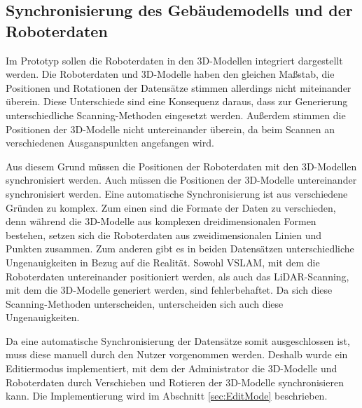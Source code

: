 \subsection{Synchronisierung des Gebäudemodells und der Roboterdaten}
Im Prototyp sollen die Roboterdaten in den 3D-Modellen integriert dargestellt werden. Die Roboterdaten und 3D-Modelle haben den gleichen Maßstab, die Positionen und Rotationen der Datensätze stimmen allerdings nicht miteinander überein. Diese Unterschiede sind eine Konsequenz daraus, dass zur Generierung unterschiedliche Scanning-Methoden eingesetzt werden. Außerdem stimmen die Positionen der 3D-Modelle nicht untereinander überein, da beim Scannen an verschiedenen Ausganspunkten angefangen wird.

Aus diesem Grund müssen die Positionen der Roboterdaten mit den 3D-Modellen synchronisiert werden. Auch müssen die Positionen der 3D-Modelle untereinander synchronisiert werden. Eine automatische Synchronisierung ist aus verschiedene Gründen zu komplex. Zum einen sind die Formate der Daten zu verschieden, denn während die 3D-Modelle aus komplexen dreidimensionalen Formen bestehen, setzen sich die Roboterdaten aus zweidimensionalen Linien und Punkten zusammen. Zum anderen gibt es in beiden Datensätzen unterschiedliche Ungenauigkeiten in Bezug auf die Realität. Sowohl \ac{VSLAM}, mit dem die Roboterdaten untereinander positioniert werden, als auch das \ac{LiDAR}-Scanning, mit dem die 3D-Modelle generiert werden, sind fehlerbehaftet. Da sich diese Scanning-Methoden unterscheiden, unterscheiden sich auch diese Ungenauigkeiten.

Da eine automatische Synchronisierung der Datensätze somit ausgeschlossen ist, muss diese manuell durch den Nutzer vorgenommen werden. Deshalb wurde ein Editiermodus implementiert, mit dem der Administrator die 3D-Modelle und Roboterdaten durch Verschieben und Rotieren der 3D-Modelle synchronisieren kann. Die Implementierung wird im Abschnitt \ref{sec:EditMode} beschrieben.

